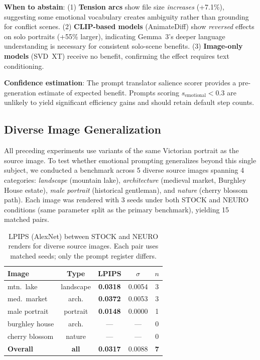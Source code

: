 \documentclass[10pt,twocolumn,letterpaper]{article}
\begin{document}
\textbf{When to abstain}: (1) \textbf{Tension arcs} show file size \textit{increases} (+7.1\%), suggesting some emotional vocabulary creates ambiguity rather than grounding for conflict scenes. (2) \textbf{CLIP-based models} (AnimateDiff) show \textit{reversed} effects on solo portraits (+55\% larger), indicating Gemma~3's deeper language understanding is necessary for consistent solo-scene benefits. (3) \textbf{Image-only models} (SVD~XT) receive no benefit, confirming the effect requires text conditioning.

\textbf{Confidence estimation}: The prompt translator salience scorer provides a pre-generation estimate of expected benefit. Prompts scoring $s_{\text{emotional}} < 0.3$ are unlikely to yield significant efficiency gains and should retain default step counts.

\subsection{Diverse Image Generalization}
\label{sec:diverse}

All preceding experiments use variants of the same Victorian portrait as the source image. To test whether emotional prompting generalizes beyond this single subject, we conducted a benchmark across 5 diverse source images spanning 4 categories: \textit{landscape} (mountain lake), \textit{architecture} (medieval market, Burghley House estate), \textit{male portrait} (historical gentleman), and \textit{nature} (cherry blossom path). Each image was rendered with 3 seeds under both STOCK and NEURO conditions (same parameter split as the primary benchmark), yielding 15 matched pairs.

\begin{table}[t]
\centering
\small
\begin{tabular}{lcccc}
\toprule
\textbf{Image} & \textbf{Type} & \textbf{LPIPS} & \textbf{$\sigma$} & \textbf{$n$} \\
\midrule
mtn.\ lake & landscape & \textbf{0.0318} & 0.0054 & 3 \\
med.\ market & arch. & \textbf{0.0372} & 0.0053 & 3 \\
male portrait & portrait & \textbf{0.0148} & 0.0000 & 1 \\
burghley house & arch. & --- & --- & 0 \\
cherry blossom & nature & --- & --- & 0 \\
\midrule
\textbf{Overall} & \textbf{all} & \textbf{0.0317} & 0.0088 & \textbf{7} \\
\bottomrule
\end{tabular}
\caption{LPIPS (AlexNet) between STOCK and NEURO renders for diverse source images. Each pair uses matched seeds; only the prompt register differs.}
\label{tab:diverse}
\end{table}
\end{document}
